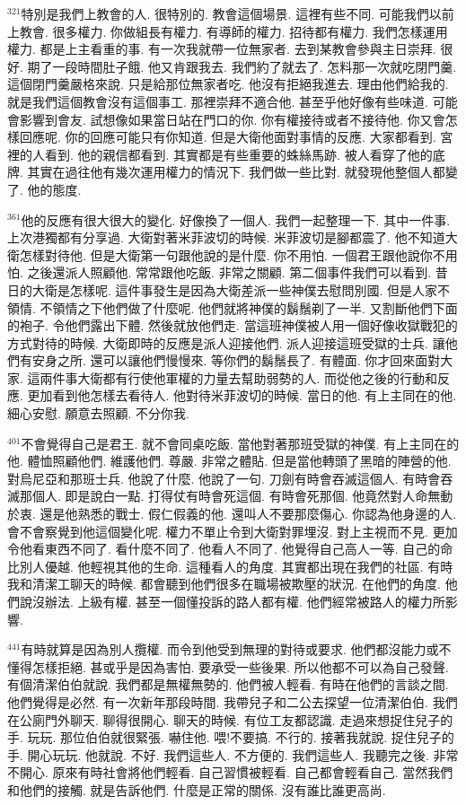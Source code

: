 \documentclass{book}
\begin{document}
$^{321}$特別是我們上教會的人.
很特別的.
教會這個場景.
這裡有些不同.
可能我們以前上教會.
很多權力.
你做組長有權力.
有導師的權力.
招待都有權力.
我們怎樣運用權力.
都是上主看重的事.
有一次我就帶一位無家者.
去到某教會參與主日崇拜.
很好.
期了一段時間肚子餓.
他又肯跟我去.
我們約了就去了.
怎料那一次就吃閉門羹.
這個閉門羹嚴格來說.
只是給那位無家者吃.
他沒有拒絕我進去.
理由他們給我的.
就是我們這個教會沒有這個事工.
那裡崇拜不適合他.
甚至乎他好像有些味道.
可能會影響到會友.
試想像如果當日站在門口的你.
你有權接待或者不接待他.
你又會怎樣回應呢.
你的回應可能只有你知道.
但是大衛他面對事情的反應.
大家都看到.
宮裡的人看到.
他的親信都看到.
其實都是有些重要的蛛絲馬跡.
被人看穿了他的底牌.
其實在過往他有幾次運用權力的情況下.
我們做一些比對.
就發現他整個人都變了.
他的態度.

$^{361}$他的反應有很大很大的變化.
好像換了一個人.
我們一起整理一下.
其中一件事.
上次港獨都有分享過.
大衛對著米菲波切的時候.
米菲波切是腳都震了.
他不知道大衛怎樣對待他.
但是大衛第一句跟他說的是什麼.
你不用怕.
一個君王跟他說你不用怕.
之後還派人照顧他.
常常跟他吃飯.
非常之關顧.
第二個事件我們可以看到.
昔日的大衛是怎樣呢.
這件事發生是因為大衛差派一些神僕去慰問別國.
但是人家不領情.
不領情之下他們做了什麼呢.
他們就將神僕的鬍鬚剃了一半.
又割斷他們下面的袍子.
令他們露出下體.
然後就放他們走.
當這班神僕被人用一個好像收獄戰犯的方式對待的時候.
大衛即時的反應是派人迎接他們.
派人迎接這班受獄的士兵.
讓他們有安身之所.
還可以讓他們慢慢來.
等你們的鬍鬚長了.
有體面.
你才回來面對大家.
這兩件事大衛都有行使他軍權的力量去幫助弱勢的人.
而從他之後的行動和反應.
更加看到他怎樣去看待人.
他對待米菲波切的時候.
當日的他.
有上主同在的他.
細心安慰.
願意去照顧.
不分你我.

$^{401}$不會覺得自己是君王.
就不會同桌吃飯.
當他對著那班受獄的神僕.
有上主同在的他.
體恤照顧他們.
維護他們.
尊嚴.
非常之體貼.
但是當他轉頭了黑暗的陣營的他.
對烏尼亞和那班士兵.
他說了什麼.
他說了一句.
刀劍有時會吞滅這個人.
有時會吞滅那個人.
即是說白一點.
打得仗有時會死這個.
有時會死那個.
他竟然對人命無動於衷.
還是他熟悉的戰士.
假仁假義的他.
還叫人不要那麼傷心.
你認為他身邊的人.
會不會察覺到他這個變化呢.
權力不單止令到大衛對罪埋沒.
對上主視而不見.
更加令他看東西不同了.
看什麼不同了.
他看人不同了.
他覺得自己高人一等.
自己的命比別人優越.
他輕視其他的生命.
這種看人的角度.
其實都出現在我們的社區.
有時我和清潔工聊天的時候.
都會聽到他們很多在職場被欺壓的狀況.
在他們的角度.
他們說沒辦法.
上級有權.
甚至一個懂投訴的路人都有權.
他們經常被路人的權力所影響.

$^{441}$有時就算是因為別人攬權.
而令到他受到無理的對待或要求.
他們都沒能力或不懂得怎樣拒絕.
甚或乎是因為害怕.
要承受一些後果.
所以他都不可以為自己發聲.
有個清潔伯伯就說.
我們都是無權無勢的.
他們被人輕看.
有時在他們的言談之間.
他們覺得是必然.
有一次新年那段時間.
我帶兒子和二公去探望一位清潔伯伯.
我們在公廁門外聊天.
聊得很開心.
聊天的時候.
有位工友都認識.
走過來想捉住兒子的手.
玩玩.
那位伯伯就很緊張.
嚇住他.
喂!不要搞.
不行的.
接著我就說.
捉住兒子的手.
開心玩玩.
他就說.
不好.
我們這些人.
不方便的.
我們這些人.
我聽完之後.
非常不開心.
原來有時社會將他們輕看.
自己習慣被輕看.
自己都會輕看自己.
當然我們和他們的接觸.
就是告訴他們.
什麼是正常的關係.
沒有誰比誰更高尚.
\end{document}
